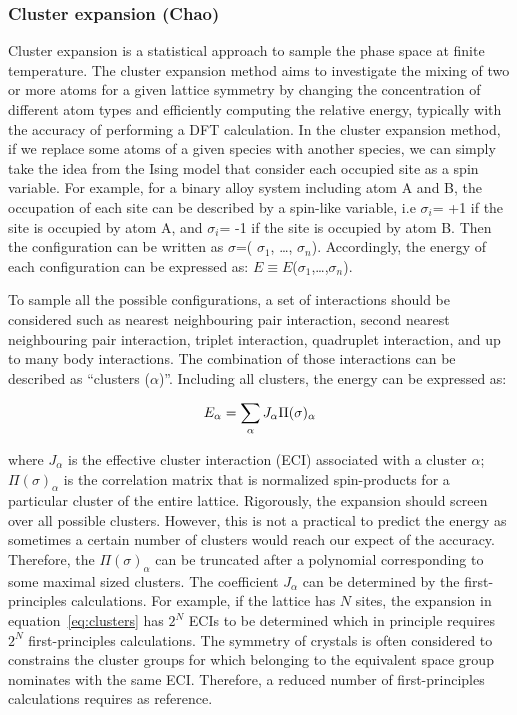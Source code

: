 \documentclass[journal=jacsat,manuscript=article]{achemso}
\begin{document}
\subsubsection{Cluster expansion (Chao)}
\label{sec:cluster_expansion}
Cluster expansion is a statistical approach to sample the phase space at finite temperature. The cluster expansion method aims to investigate the mixing of two or more atoms for a given lattice symmetry by changing the concentration of different atom types and efficiently computing the relative energy, typically with the accuracy of performing a DFT calculation. In the cluster expansion method, if we replace some atoms of a given species with another species, we can simply take the idea from the Ising model that consider each occupied site as a spin variable. For example, for a binary alloy system including atom A and B, the occupation of each site can be described by a spin-like variable, i.e $\sigma_i$= +1 if the site is occupied by atom A, and $\sigma_i$= -1 if the site is occupied by atom B. Then the configuration can be written as $\sigma$=( $\sigma_1$, …, $\sigma_n$). Accordingly, the energy of each configuration can be expressed as: $E\equiv E$($\sigma_1$,…,$\sigma_n$).

To sample all the possible configurations, a set of interactions should be considered such as nearest neighbouring pair interaction, second nearest neighbouring pair interaction, triplet interaction, quadruplet interaction, and up to many body interactions. The combination of those interactions can be described as “clusters ($\alpha$)”. Including all clusters, the energy can be expressed as:


\begin{equation}
    \centering
    {E}_{\alpha}=\sum_\alpha {J_\alpha}{\Pi(\sigma)_\alpha}
    \label{eq:clusters}
\end{equation} 


where $J_\alpha$ is the effective cluster interaction (ECI) associated with a cluster $\alpha$; $\Pi(\sigma)_\alpha$ is the correlation matrix that is normalized spin-products for a particular cluster of the entire lattice. Rigorously, the expansion should screen over all possible clusters. However, this is not a practical to predict the energy as sometimes a certain number of clusters would reach our expect of the accuracy. Therefore, the  $\Pi(\sigma)_\alpha$ can be truncated after a polynomial corresponding to some maximal sized clusters. The coefficient $J_\alpha$ can be determined by the first-principles calculations. For example, if the lattice has $N$ sites, the expansion in equation~\ref{eq:clusters} has $2^N$ ECIs to be determined which in principle requires $2^N$ first-principles calculations. The symmetry of crystals is often considered to constrains the cluster groups for which belonging to the equivalent space group nominates with the same ECI. Therefore, a reduced number of first-principles calculations requires as reference. 
\end{document}
